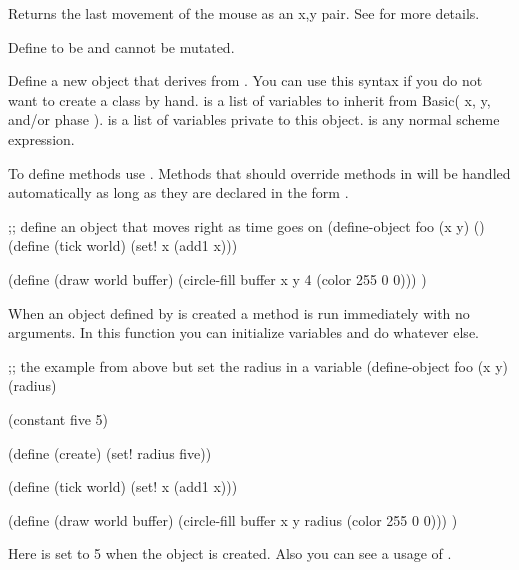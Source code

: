 
Returns the last movement of the mouse as an x,y pair. See  for more details.


Define  to be  and  cannot be mutated.


Define a new object that derives from . You can use this syntax if you do not want to create a class by hand.  is a list of variables to inherit from Basic( x, y, and/or phase ).  is a list of variables private to this object.  is any normal scheme expression.

To define methods use . Methods that should override methods in  will be handled automatically as long as they are declared in the form .

\begin{schemedisplay}
;; define an object that moves right as time goes on
(define-object foo (x y) ()
  (define (tick world)
    (set! x (add1 x)))

  (define (draw world buffer)
    (circle-fill buffer x y 4 (color 255 0 0)))
  )
\end{schemedisplay}

When an object defined by  is created a method  is run immediately with no arguments. In this function you can initialize variables and do whatever else.
\begin{schemedisplay}
;; the example from above but set the radius in a variable
(define-object foo (x y) (radius)

  (constant five 5)

  (define (create)
    (set! radius five))

  (define (tick world)
    (set! x (add1 x)))

  (define (draw world buffer)
    (circle-fill buffer x y radius (color 255 0 0)))
  )
\end{schemedisplay}

Here  is set to 5 when the object is created. Also you can see a usage of .


